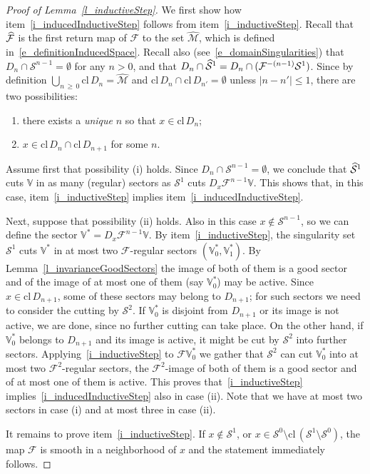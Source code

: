 \documentclass[10pt]{amsart}
\theoremstyle{definition}\newtheorem{defi}[theo]{Definition}\newtheorem{rema}[theo]{Remark}\newtheorem{exam}[theo]{Example}\newtheorem{exem}[theo]{Example}\newtheorem{nota}[theo]{Notation}
\newcommand{\nin}{\not\in}
\newcommand{\cl}[1]{\mathrm{cl}\,#1}
\newcommand{\cm}{\mathcal{F}}
\newcommand{\csp}{\mathcal{M}}
\newcommand{\cmp}{\hat\cm}
\newcommand{\cspi}{\widehat{\csp}}
\newcommand{\singPrivate}{\mathcal{S}}
\newcommand{\sing}[1]{\singPrivate^{#1}}
\newcommand{\singp}[1]{\hat{\singPrivate}^{#1}}
\newcommand{\cV}{\mathbb{V}}
\newcommand{\Dom}{D}
\newcommand*{\relabel}{\renewcommand{\labelenumi}{(\theenumi)}}
\newcommand*{\romanenumi}{\renewcommand*{\theenumi}{\roman{enumi}}\relabel}
\let\oldhat\hat
\renewcommand*{\hat}[1]{\mathchoice{\widehat{#1}}{\widehat{#1}}{\oldhat{#1}}{\oldhat{#1}}}
\begin{document}
\begin{proof}[Proof of Lemma~\ref{l_inductiveStep}]
We first show how item~\eqref{i_inducedInductiveStep} follows from item~\eqref{i_inductiveStep}. Recall that $\cmp$ is the first return map of $\cm$ to the set $\cspi$, which is defined in~\eqref{e_definitionInducedSpace}. Recall also (see~\eqref{e_domainSingularities}) that $\Dom_n\cap\sing{n-1} = \emptyset$ for any $n > 0$, and that $\Dom_n\cap\singp1 = \Dom_n\cap (\cm^{-(n-1)}\sing1)$. Since by definition $\bigcup_{n\,\ge\,0}\cl\Dom_n = \cspi$ and $\cl\Dom_n\cap\cl\Dom_{n'} = \emptyset$ unless $|n-n'|\le 1$, there are two possibilities:
\begin{enumerate}\romanenumi
\item there exists a {\em unique} $n$ so that $x\in \cl\Dom_n$;
\item $x\in\cl\Dom_n\cap\cl\Dom_{n+1}$ for some $n$.
\end{enumerate}
Assume first that possibility (i) holds. Since $\Dom_n\cap\sing{n-1} = \emptyset$, we conclude that $\singp1$ cuts $\cV$ in as many (regular) sectors as $\sing1$ cuts $D_{x}\cm^{n-1}\cV$. This shows that, in this case, item~\eqref{i_inductiveStep} implies item~\eqref{i_inducedInductiveStep}.

Next, suppose that possibility (ii) holds. Also in this case $x\nin\sing{n-1}$, so we can define the sector $\cV^{*} = D_{x}\cm^{n-1}\cV$. By item~\eqref{i_inductiveStep}, the singularity set $\sing1$ cuts $\cV^*$ in at most two $\cm$-regular sectors $(\cV^*_0,\cV^{*}_1)$. By Lemma~\ref{l_invarianceGoodSectors} the image of both of them is a good sector and of the image of at most one of them (say $\cV^{*}_0$) may be active. Since $x\in\cl\Dom_{n+1}$, some of these sectors may belong to $\Dom_{n+1}$; for such sectors we need to consider the cutting by $\sing2$. If $\cV^*_0$ is disjoint from $\Dom_{n+1}$ or its image is not active, we are done, since no further cutting can take place. On the other hand, if $\cV^*_0$ belongs to $\Dom_{n+1}$ and its image is active, it might be cut by $\sing2$ into further sectors. Applying~\eqref{i_inductiveStep} to $\cm\cV^*_0$ we gather that $\sing2$ can cut $\cV^*_0$ into at most two $\cm^2$-regular sectors, the $\cm^2$-image of both of them is a good sector and of at most one of them is active. This proves that~\eqref{i_inductiveStep} implies~\eqref{i_inducedInductiveStep} also in case (ii). Note that we have at most two sectors in case (i) and at most three in case (ii).


It remains to prove item~\eqref{i_inductiveStep}. If $x\not\in\sing1$, or $x\in\sing0\setminus\cl(\sing1\setminus\sing0)$, the map $\cm$ is smooth in a neighborhood of $x$ and the statement immediately follows.


\end{proof}
\end{document}
